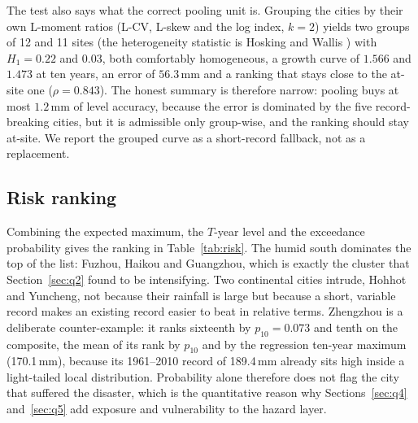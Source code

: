 The test also says what the correct pooling unit is. Grouping the cities by their own L-moment ratios (L-CV, L-skew and the log index, $k=2$) yields two groups of 12 and 11 sites (the heterogeneity statistic is Hosking and Wallis \cite{hosking1993}) with $H_1=0.22$ and $0.03$, both comfortably homogeneous, a growth curve of $1.566$ and $1.473$ at ten years, an error of $56.3$\,mm and a ranking that stays close to the at-site one ($\rho=0.843$). The honest summary is therefore narrow: pooling buys at most $1.2$\,mm of level accuracy, because the error is dominated by the five record-breaking cities, but it is admissible only group-wise, and the ranking should stay at-site. We report the grouped curve as a short-record fallback, not as a replacement.

\subsection{Risk ranking}

Combining the expected maximum, the $T$-year level and the exceedance probability gives the ranking in Table~\ref{tab:risk}. The humid south dominates the top of the list: Fuzhou, Haikou and Guangzhou, which is exactly the cluster that Section~\ref{sec:q2} found to be intensifying. Two continental cities intrude, Hohhot and Yuncheng, not because their rainfall is large but because a short, variable record makes an existing record easier to beat in relative terms. Zhengzhou is a deliberate counter-example: it ranks sixteenth by $p_{10}=0.073$ and tenth on the composite, the mean of its rank by $p_{10}$ and by the regression ten-year maximum (170.1\,mm), because its 1961--2010 record of 189.4\,mm already sits high inside a light-tailed local distribution. Probability alone therefore does not flag the city that suffered the disaster, which is the quantitative reason why Sections~\ref{sec:q4} and~\ref{sec:q5} add exposure and vulnerability to the hazard layer.

